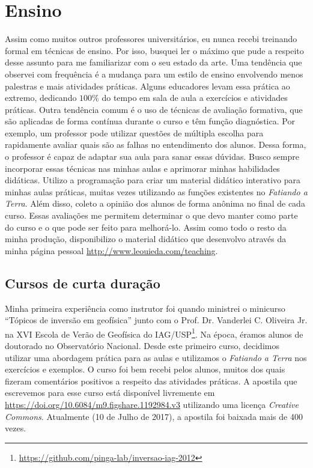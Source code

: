 \section{Ensino}

Assim como muitos outros professores universitários, eu nunca recebi treinando
formal em técnicas de ensino.
Por isso, busquei ler o máximo que pude a respeito desse assunto para me
familiarizar com o seu estado da arte.
Uma tendência que observei com frequência é a mudança para um estilo de ensino
envolvendo menos palestras e mais atividades práticas.
Alguns educadores levam essa prática ao extremo, dedicando $100\%$ do tempo em
sala de aula a exercícios e atividades práticas.
Outra tendência comum é o uso de técnicas de avaliação formativa, que são
aplicadas de forma contínua durante o curso e têm função diagnóstica.
Por exemplo, um professor pode utilizar questões de múltipla escolha para
rapidamente avaliar quais são as falhas no entendimento dos alunos.
Dessa forma, o professor é capaz de adaptar sua aula para sanar essas dúvidas.
Busco sempre incorporar essas técnicas nas minhas aulas e aprimorar minhas
habilidades didáticas.
Utilizo a programação para criar um material didático interativo para minhas
aulas práticas, muitas vezes utilizando as funções existentes no
\textit{Fatiando a Terra}.
Além disso, coleto a opinião dos alunos de forma anônima no final de cada
curso.
Essas avaliações me permitem determinar o que devo manter como parte do curso e
o que pode ser feito para melhorá-lo.
Assim como todo o resto da minha produção, disponibilizo o material didático
que desenvolvo através da minha página pessoal
\url{http://www.leouieda.com/teaching}.


\subsection{Cursos de curta duração}

Minha primeira experiência como instrutor foi quando ministrei o minicurso
``Tópicos de inversão em geofísica'' junto com o Prof. Dr. Vanderlei C.
Oliveira Jr. na XVI Escola de Verão de Geofísica do
IAG/USP\footnote{\url{https://github.com/pinga-lab/inversao-iag-2012}}.
Na época, éramos alunos de doutorado no Observatório Nacional.
Desde este primeiro curso, decidimos utilizar uma abordagem prática para as
aulas e utilizamos o \textit{Fatiando a Terra} nos exercícios e exemplos.
O curso foi bem recebi pelos alunos, muitos dos quais fizeram comentários
positivos a respeito das atividades práticas.
A apostila que escrevemos para esse curso está disponível livremente em
\url{https://doi.org/10.6084/m9.figshare.1192984.v3} utilizando uma licença
\textit{Creative Commons}.
Atualmente (10 de Julho de 2017), a apostila foi baixada mais de 400 vezes.

